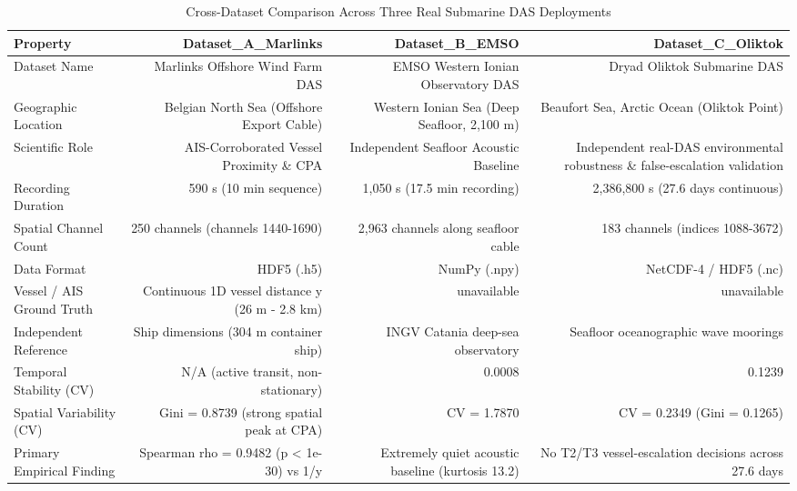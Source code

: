 \begin{table}[htbp]
\centering
\caption{Cross-Dataset Comparison Across Three Real Submarine DAS Deployments}
\begin{tabular}{lrrr}
\toprule
Property & Dataset\_A\_Marlinks & Dataset\_B\_EMSO & Dataset\_C\_Oliktok \\
\midrule
Dataset Name & Marlinks Offshore Wind Farm DAS & EMSO Western Ionian Observatory DAS & Dryad Oliktok Submarine DAS \\
Geographic Location & Belgian North Sea (Offshore Export Cable) & Western Ionian Sea (Deep Seafloor, 2,100 m) & Beaufort Sea, Arctic Ocean (Oliktok Point) \\
Scientific Role & AIS-Corroborated Vessel Proximity \& CPA & Independent Seafloor Acoustic Baseline & Independent real-DAS environmental robustness \& false-escalation validation \\
Recording Duration & 590 s (10 min sequence) & 1,050 s (17.5 min recording) & 2,386,800 s (27.6 days continuous) \\
Spatial Channel Count & 250 channels (channels 1440-1690) & 2,963 channels along seafloor cable & 183 channels (indices 1088-3672) \\
Data Format & HDF5 (.h5) & NumPy (.npy) & NetCDF-4 / HDF5 (.nc) \\
Vessel / AIS Ground Truth & Continuous 1D vessel distance y (26 m - 2.8 km) & unavailable & unavailable \\
Independent Reference & Ship dimensions (304 m container ship) & INGV Catania deep-sea observatory & Seafloor oceanographic wave moorings \\
Temporal Stability (CV) & N/A (active transit, non-stationary) & 0.0008 & 0.1239 \\
Spatial Variability (CV) & Gini = 0.8739 (strong spatial peak at CPA) & CV = 1.7870 & CV = 0.2349 (Gini = 0.1265) \\
Primary Empirical Finding & Spearman rho = 0.9482 (p < 1e-30) vs 1/y & Extremely quiet acoustic baseline (kurtosis 13.2) & No T2/T3 vessel-escalation decisions across 27.6 days \\
\bottomrule
\end{tabular}
\end{table}
